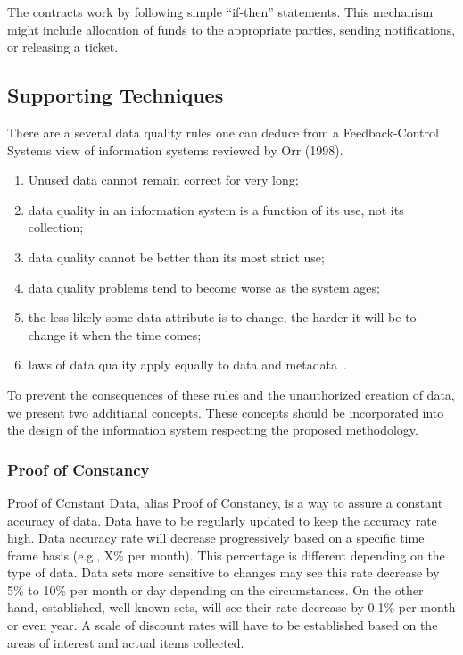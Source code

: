 The contracts work by following simple \enquote{if-then} statements.
This mechanism might include allocation of funds to the appropriate parties, sending notifications, or releasing a ticket.

\subsection{Supporting Techniques}

There are a several data quality rules one can deduce from a Feedback-Control Systems view of information systems reviewed by Orr (1998).

\begin{enumerate}
    \item Unused data cannot remain correct for very long;
    \item data quality in an information system is a function of its use, not its collection;
    \item data quality cannot be better than its most strict use;
    \item data quality problems tend to become worse as the system ages;
    \item the less likely some data attribute is to change, the harder it will be to change it when the time comes;
    \item laws of data quality apply equally to data and metadata~\cite{orr1998}.
\end{enumerate}

To prevent the consequences of these rules and the unauthorized creation of data, we present two additianal concepts.
These concepts should be incorporated into the design of the information system respecting the proposed methodology.

\subsubsection{Proof of Constancy}

Proof of Constant Data, alias Proof of Constancy, is a way to assure a constant accuracy of data.
Data have to be regularly updated to keep the accuracy rate high.
Data accuracy rate will decrease progressively based on a specific time frame basis (e.g., X\% per month).
This percentage is different depending on the type of data.
Data sets more sensitive to changes may see this rate decrease by 5\% to 10\% per month or day depending on the circumstances.
On the other hand, established, well-known sets, will see their rate decrease by 0.1\% per month or even year.
A scale of discount rates will have to be established based on the areas of interest and actual items collected.

